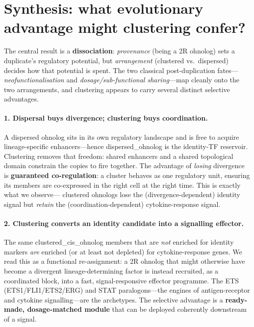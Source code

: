 \documentclass[11pt]{article}
\newcommand{\dispoh}{\textcolor{ohnolog}{dispersed\_ohnolog}}
\newcommand{\clusoh}{\textcolor{ohnolog}{clustered\_cis\_ohnolog}}
\begin{document}
\section{Synthesis: what evolutionary advantage might clustering confer?}

The central result is a \textbf{dissociation}: \emph{provenance} (being a 2R ohnolog) sets
a duplicate's regulatory potential, but \emph{arrangement} (clustered vs.\ dispersed)
decides how that potential is spent. The two classical post-duplication fates---
\emph{neofunctionalisation} and \emph{dosage/sub-functional sharing}---map cleanly onto the
two arrangements, and clustering appears to carry several distinct selective advantages.

\paragraph{1. Dispersal buys divergence; clustering buys coordination.}
A dispersed ohnolog sits in its own regulatory landscape and is free to acquire
lineage-specific enhancers---hence \dispoh{} is the identity-TF reservoir. Clustering
removes that freedom: shared enhancers and a shared topological domain constrain the
copies to fire together. The advantage of \emph{losing} divergence is \textbf{guaranteed
co-regulation}: a cluster behaves as one regulatory unit, ensuring its members are
co-expressed in the right cell at the right time. This is exactly what we observe---
clustered ohnologs lose the (divergence-dependent) identity signal but \emph{retain} the
(coordination-dependent) cytokine-response signal.

\paragraph{2. Clustering converts an identity candidate into a signalling effector.}
The same \clusoh{} members that are \emph{not} enriched for identity markers \emph{are}
enriched (or at least not depleted) for cytokine-response genes. We read this as a
functional re-assignment: a 2R ohnolog that might otherwise have become a divergent
lineage-determining factor is instead recruited, as a coordinated block, into a
fast, signal-responsive effector programme. The ETS (ETS1/FLI1/ETS2/ERG) and STAT
paralogons---the engines of antigen-receptor and cytokine signalling---are the
archetypes. The selective advantage is a \textbf{ready-made, dosage-matched module} that
can be deployed coherently downstream of a signal.
\end{document}
